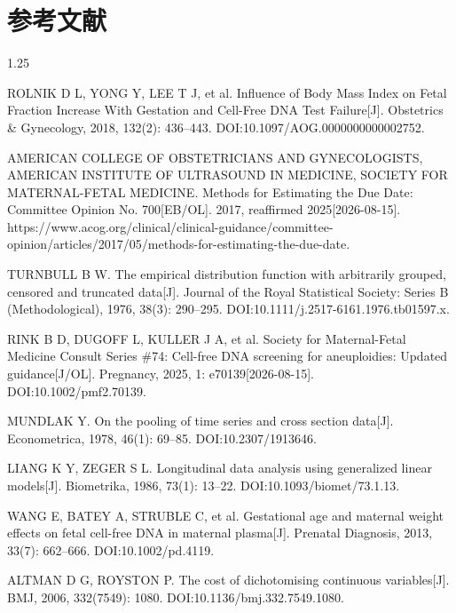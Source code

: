 \documentclass[12pt,a4paper]{ctexrep}
\numberwithin{equation}{section}
\begin{document}
	\newpage
	
	
	\section{参考文献}

	
	\begin{spacing}{1.25} %
	\sloppy
	\begin{enumerate}[label={[\arabic*]}, leftmargin=2em, labelwidth=1.5em, labelsep=0.5em, itemsep=0pt, parsep=0pt, partopsep=0pt, topsep=0pt]		
		\item ROLNIK D L, YONG Y, LEE T J, et al. Influence of Body Mass Index on Fetal Fraction Increase With Gestation and Cell-Free DNA Test Failure[J]. Obstetrics \& Gynecology, 2018, 132(2): 436--443. DOI:10.1097/AOG.0000000000002752.
		\item AMERICAN COLLEGE OF OBSTETRICIANS AND GYNECOLOGISTS, AMERICAN INSTITUTE OF ULTRASOUND IN MEDICINE, SOCIETY FOR MATERNAL-FETAL MEDICINE. Methods for Estimating the Due Date: Committee Opinion No. 700[EB/OL]. 2017, reaffirmed 2025[2026-08-15]. https://www.acog.org/clinical/clinical-guidance/committee-opinion/articles/2017/05/methods-for-estimating-the-due-date.
		\item TURNBULL B W. The empirical distribution function with arbitrarily grouped, censored and truncated data[J]. Journal of the Royal Statistical Society: Series B (Methodological), 1976, 38(3): 290--295. DOI:10.1111/j.2517-6161.1976.tb01597.x.
		\item RINK B D, DUGOFF L, KULLER J A, et al. Society for Maternal-Fetal Medicine Consult Series \#74: Cell-free DNA screening for aneuploidies: Updated guidance[J/OL]. Pregnancy, 2025, 1: e70139[2026-08-15]. DOI:10.1002/pmf2.70139.
		\item MUNDLAK Y. On the pooling of time series and cross section data[J]. Econometrica, 1978, 46(1): 69--85. DOI:10.2307/1913646.
		\item LIANG K Y, ZEGER S L. Longitudinal data analysis using generalized linear models[J]. Biometrika, 1986, 73(1): 13--22. DOI:10.1093/biomet/73.1.13.
		\item WANG E, BATEY A, STRUBLE C, et al. Gestational age and maternal weight effects on fetal cell-free DNA in maternal plasma[J]. Prenatal Diagnosis, 2013, 33(7): 662--666. DOI:10.1002/pd.4119.
		\item ALTMAN D G, ROYSTON P. The cost of dichotomising continuous variables[J]. BMJ, 2006, 332(7549): 1080. DOI:10.1136/bmj.332.7549.1080.

\end{enumerate}
\end{spacing}
\end{document}
